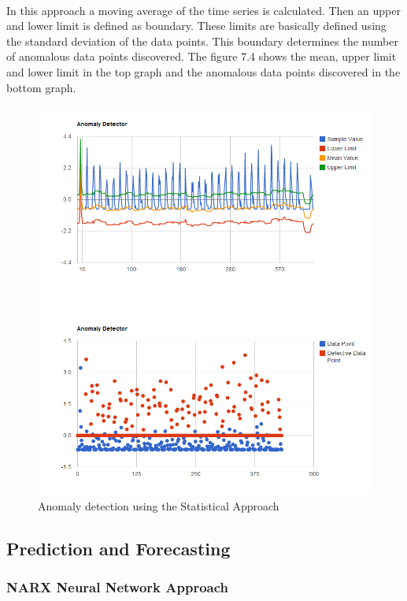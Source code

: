\documentclass[12pt,a4paper]{report}
\begin{document}
\paragraph{} In this approach a moving average of the time series is calculated. Then an upper and lower limit is defined as boundary. These limits are basically defined using the standard deviation of the data points. This boundary determines the number of anomalous data points discovered. The figure 7.4 shows the mean, upper limit and lower limit in the top graph and the anomalous data points discovered in the bottom graph.
\begin{figure}[h!]

  \centering
    \includegraphics[scale=0.5]{./screenshots/result_ano_stat.png}
  \caption{Anomaly detection using the Statistical Approach}
\end{figure}


\subsection{Prediction and Forecasting}
\subsubsection{NARX Neural Network Approach}
\end{document}
